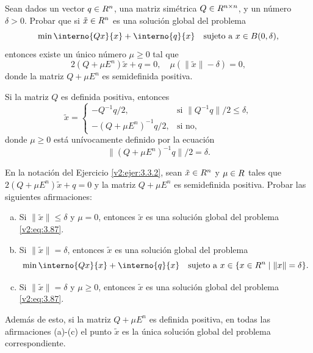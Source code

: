 \begin{exercise}\label{v2:ejer:3.3.2}
    Sean dados un vector $q \in R^n$, una matriz simétrica $Q \in R^{n \times n}$, y un número $\delta > 0$. Probar que si $\tilde{x} \in R^n$ es una solución global del problema
    \begin{equation}
        \min \interno{Qx}{x} + \interno{q}{x} \quad \text{sujeto a } x \in B(0, \delta),
        \label{v2:eq:3.87}
    \end{equation}
    entonces existe un único número $\mu \ge 0$ tal que
    \[
        2(Q + \mu E^n)\tilde{x} + q = 0, \quad \mu(\|\tilde{x}\| - \delta) = 0,
    \]
    donde la matriz $Q + \mu E^n$ es semidefinida positiva.
    
    Si la matriz $Q$ es definida positiva, entonces
    \[
        \tilde{x} = \begin{cases}
            -Q^{-1}q / 2, & \text{si } \|Q^{-1}q\|/2 \le \delta, \\
            -(Q + \mu E^n)^{-1}q / 2, & \text{si no,}
        \end{cases}
    \]
    donde $\mu \ge 0$ está unívocamente definido por la ecuación
    \[
        \|(Q + \mu E^n)^{-1}q\| / 2 = \delta.
    \]
\end{exercise}

\begin{exercise}\label{v2:ejer:3.3.3}
    En la notación del Ejercicio \ref{v2:ejer:3.3.2}, sean $\tilde{x} \in R^n$ y $\mu \in R$ tales que $2(Q + \mu E^n)\tilde{x} + q = 0$ y la matriz $Q + \mu E^n$ es semidefinida positiva. Probar las siguientes afirmaciones:
    \begin{enumerate}[(a)]
        \item Si $\|\tilde{x}\| \le \delta$ y $\mu = 0$, entonces $\tilde{x}$ es una solución global del problema \eqref{v2:eq:3.87}.
        \item Si $\|\tilde{x}\| = \delta$, entonces $\tilde{x}$ es una solución global del problema
        \[
            \min \interno{Qx}{x} + \interno{q}{x} \quad \text{sujeto a } x \in \{x \in \Rn \mid \|x\| = \delta\}.
        \]
        \item Si $\|\tilde{x}\| = \delta$ y $\mu \ge 0$, entonces $\tilde{x}$ es una solución global del problema \eqref{v2:eq:3.87}.
    \end{enumerate}
    Además de esto, si la matriz $Q + \mu E^n$ es definida positiva, en todas las afirmaciones (a)-(c) el punto $\tilde{x}$ es la única solución global del problema correspondiente.
\end{exercise}

